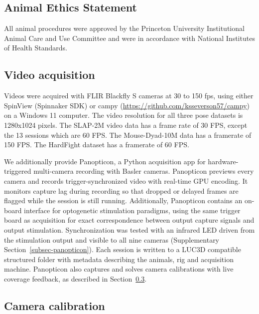 \documentclass[pdflatex, sn-nature]{sn-jnl}
\theoremstyle{thmstyleone}%
\theoremstyle{thmstyletwo}%
\theoremstyle{thmstylethree}%
\begin{document}
\subsection{Animal Ethics Statement}\label{methods-mice}

All animal procedures were approved by the Princeton University Institutional Animal Care and Use Committee and were in accordance with National Institutes of Health Standards. 

\subsection{Video acquisition}\label{methods-acquisition}
Videos were acquired with FLIR Blackfly S cameras at 30 to 150 fps, using either SpinView (Spinnaker SDK) or campy (\url{https://github.com/ksseverson57/campy}) on a Windows 11 computer. The video resolution for all three pose datasets is 1280x1024 pixels. The SLAP-2M video data has a frame rate of 30 FPS, except the 13 sessions which are 60 FPS. The Mouse-Dyad-10M data has a framerate of 150 FPS. The HardFight dataset has a framerate of 60 FPS. 

We additionally provide Panopticon, a Python acquisition app for hardware-triggered multi-camera recording with Basler cameras. Panopticon previews every camera and records trigger-synchronized video with real-time GPU encoding. It monitors capture lag during recording so that dropped or delayed frames are flagged while the session is still running. Additionally, Panopticon contains an on-board interface for optogenetic stimulation paradigms, using the same trigger board as acquisition for exact correspondence between output capture signals and output stimulation. Synchronization was tested with an infrared LED driven from the stimulation output and visible to all nine cameras (Supplementary Section~\ref{subsec-panopticon}). Each session is written to a LUC3D compatible structured folder with metadata describing the animals, rig and acquisition machine. Panopticon also captures and solves camera calibrations with live coverage feedback, as described in Section~\ref{methods-calibration}.

\subsection{Camera calibration}\label{methods-calibration}
\end{document}
